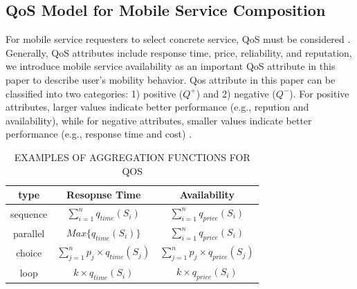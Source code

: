 \documentclass[10pt,journal,compsoc]{IEEEtran}
\begin{document}
\subsection{QoS Model for Mobile Service Composition}
For mobile service requesters to select concrete service, QoS must be considered \cite{wu2013predicting,luo2014efficient,luo2016generating}. Generally, QoS attributes include response time, price, reliability, and reputation, we introduce mobile service availability as an important QoS attribute in this paper to describe user's mobility behavior. Qos attribute in this paper can be classified into two categories: 1) positive ($Q^+$) and 2) negative ($Q^{-}$). For positive attributes, larger values indicate better performance (e.g., repution and availability), while for negative attributes, smaller values indicate better performance (e.g., response time and cost) \cite{Wu2016}.	

\begin{table}[!t]
\renewcommand{\arraystretch}{1.3}
\caption{EXAMPLES OF AGGREGATION FUNCTIONS FOR QOS}
\label{table_example}
\centering

\begin{tabular}{ccc}
\hline
\bfseries type & \bfseries Resopnse Time & \bfseries Availability \\
\hline
sequence & $\sum_{i=1}^{n}q_{time}(S_i)$ & $\sum_{i=1}^{n}q_{price}(S_i)$ \\
parallel & $Max\{q_{time}(S_i)\}$ & $\sum_{i=1}^{n}q_{price}(S_i)$ \\
choice & $\sum_{j=1}^{n} p_j \times q_{time}(S_j)$ & $\sum_{j=1}^{n} p_j \times q_{price}(S_j)$ \\
loop & $k \times q_{time}(S_i)$ & $k \times q_{price}(S_i)$ \\
\hline
\end{tabular}
\end{table}
\end{document}
